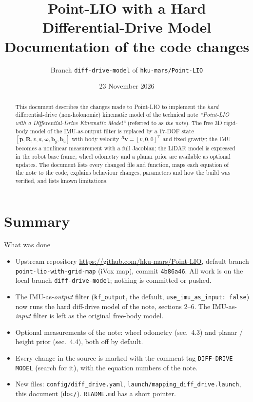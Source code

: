 \documentclass[11pt,a4paper]{article}
\title{\textbf{Point-LIO with a Hard Differential-Drive Model}\\[2pt]
\large Documentation of the code changes}
\author{Branch \texttt{diff-drive-model} of \texttt{hku-mars/Point-LIO}}
\date{23 November 2026}
\newcommand{\f}[1]{\texttt{#1}}
\newcommand{\R}{\mathbf{R}}
\newcommand{\p}{\mathbf{p}}
\newcommand{\w}{\bm{\omega}}
\begin{document}
\maketitle

\begin{abstract}
This document describes the changes made to Point-LIO to implement the
\emph{hard} differential-drive (non-holonomic) kinematic model of the technical
note \emph{``Point-LIO with a Differential-Drive Kinematic Model''} (referred to
as \emph{the note}). The free 3D rigid-body model of the IMU-as-output filter is
replaced by a 17-DOF state $[\p,\R,v,a,\w,\mathbf b_g,\mathbf b_a]$ with body
velocity $^B\mathbf v=[v,0,0]^\top$ and fixed gravity; the IMU becomes a
nonlinear measurement with a full Jacobian; the LiDAR model is expressed in the
robot base frame; wheel odometry and a planar prior are available as optional
updates. The document lists every changed file and function, maps each
equation of the note to the code, explains behaviour changes, parameters and
how the build was verified, and lists known limitations.
\end{abstract}

\tableofcontents
\newpage

\section{Summary}

\begin{note}{What was done}
\begin{itemize}\itemsep1pt
\item Upstream repository \url{https://github.com/hku-mars/Point-LIO}, default
  branch \f{point-lio-with-grid-map} (iVox map), commit \f{4b86a46}. All work is
  on the local branch \f{diff-drive-model}; nothing is committed or pushed.
\item The IMU-as-\emph{output} filter (\f{kf\_output}, the default,
  \f{use\_imu\_as\_input: false}) now runs the hard diff-drive model of the
  note, sections 2--6. The IMU-as-\emph{input} filter is left as the original
  free-body model.
\item Optional measurements of the note: wheel odometry (sec.\ 4.3) and planar /
  height prior (sec.\ 4.4), both off by default.
\item Every change in the source is marked with the comment tag
  \f{DIFF-DRIVE MODEL} (search for it), with the equation numbers of the note.
\item New files: \f{config/diff\_drive.yaml}, \f{launch/mapping\_diff\_drive.launch},
  this document (\f{doc/}). \f{README.md} has a short pointer.
\end{itemize}
\end{note}
\end{document}
